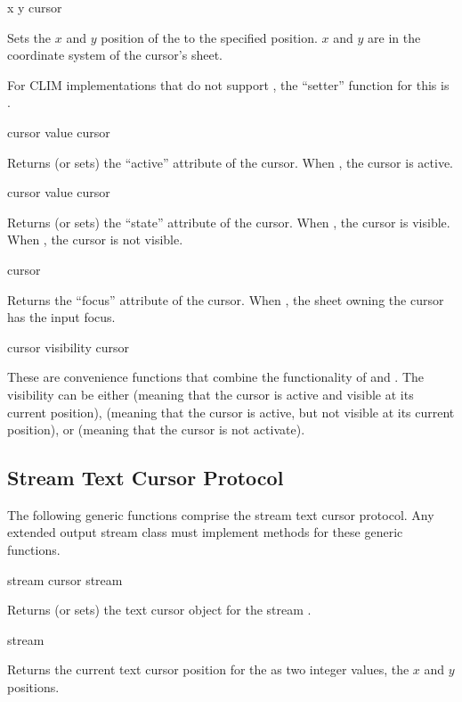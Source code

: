  {x y cursor}

Sets the $x$ and $y$ position of the   to the specified
position.  $x$ and $y$ are in the coordinate system of the cursor's sheet.

For CLIM implementations that do not support , the ``setter'' function
for this is .

 {cursor}
 {value cursor}

Returns (or sets) the ``active'' attribute of the cursor.  When , the
cursor is active.

 {cursor}
 {value cursor}

Returns (or sets) the ``state'' attribute of the cursor.  When , the
cursor is visible.  When , the cursor is not visible.

 {cursor}

Returns the ``focus'' attribute of the cursor.  When , the sheet
owning the cursor has the input focus.

 {cursor}
 {visibility cursor}

These are convenience functions that combine the functionality of
 and .  The visibility can be either 
(meaning that the cursor is active and visible at its current position),
 (meaning that the cursor is active, but not visible at its current
position), or  (meaning that the cursor is not activate).


\subsection {Stream Text Cursor Protocol}

The following generic functions comprise the stream text cursor protocol.  Any
extended output stream class must implement methods for these generic functions.

 {stream}
 {cursor stream}

Returns (or sets) the text cursor object for the stream .


 {stream}

Returns the current text cursor position for the 
 as two integer values, the $x$ and $y$ positions.

